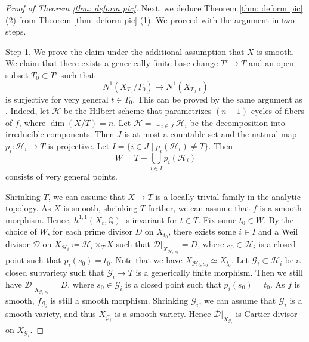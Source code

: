 \documentclass[11pt,oneside,reqno]{amsart}
\numberwithin{equation}{section}
\theoremstyle{definition}
\newcommand{\bQ}{\mathbb{Q}}
\newcommand{\mD}{\mathcal{D}}
\newcommand{\mG}{\mathcal{G}}
\newcommand{\mH}{\mathcal{H}}
\newcommand{\mO}{\mathcal{O}}
\begin{document}
\begin{proof}[Proof of Theorem \ref{thm: deform pic}]
Next, we deduce Theorem \ref{thm: deform pic} (2) from Theorem \ref{thm: deform pic} (1). We proceed with the argument in two steps.


Step 1. We prove the claim under the additional assumption that $X$ is smooth. We claim that there exists a generically finite base change $T' \to T$ and an open subset $T_0 \subset T'$ such that 
\[
N^1(X_{T_0}/T_0) \to N^1(X_{T_0,t})
\] is surjective for very general $t\in T_0$. This can be proved by the same argument as \cite[Proposition 12.2.5]{KM92}. Indeed, let $\mH$ be the Hilbert scheme that parametrizes $(n-1)$-cycles of fibers of $f$, where $\dim (X/T)=n$. Let $\mH = \cup_{i\in J} \mH_i$ be the decomposition into irreducible components. Then $J$ is at most a countable set and the natural map $p_i: \mH_i \to T$ is projective. Let $I = \{i \in J \mid p_i(\mH_i) \neq T\}$. Then 
\[
W = T -\bigcup_{i\in I}p_i(\mH_i)
\] consists of very general points. 

Shrinking $T$, we can assume that $X \to T$ is a locally trivial family in the analytic topology. As $X$ is smooth, shrinking $T$ further, we can assume that $f$ is a smooth morphism. Hence, $h^{1,1}(X_{t}, \bQ)$ is invariant for $t\in T$. 
Fix some $t_0\in W$. By the choice of $W$, for each prime divisor $D$ on $X_{t_0}$, there exists some $i\in I$ and a Weil divisor $\mD$ on $X_{\mH_i}\coloneqq \mH_i \times_T X$ such that $\mD|_{X_{\mH_i,s_0}} = D$, where $s_0 \in \mH_i$ is a closed point such that $p_i(s_0)=t_0$. Note that we have $X_{\mH_i,s_0} \simeq X_{t_0}$. Let $\mG_i \subset \mH_i$ be a closed subvariety such that $\mG_i \to T$ is a generically finite morphism. Then we still have $\mD|_{X_{\mG_i,s_0}} = D$, where $s_0 \in \mG_i$ is a closed point such that $p_i(s_0)=t_0$. As $f$ is smooth, $f_{\mG_i}$ is still a smooth morphism. Shrinking $\mG_i$, we can assume that $\mG_i$ is a smooth variety, and thus $X_{\mG_i}$ is a smooth variety. Hence $\mD|_{X_{\mG_i}}$ is Cartier divisor on $X_{\mG_i}$. 


\end{proof}
\end{document}
